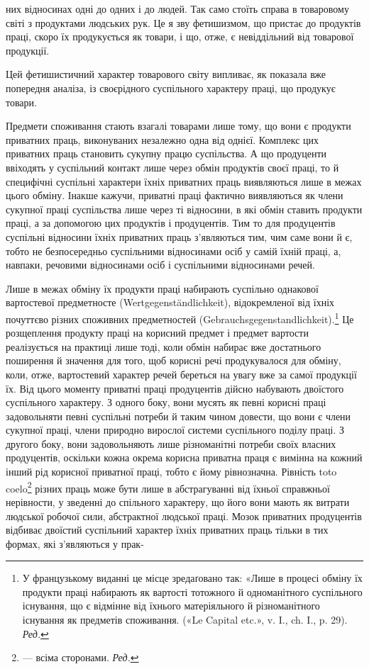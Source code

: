 них відносинах одні до одних і до людей. Так само стоїть справа
в товаровому світі з продуктами людських рук. Це я зву фетишизмом,
що пристає до продуктів праці, скоро їх продукується
як товари, і що, отже, є невіддільний від товарової продукції.

Цей фетишистичний характер товарового світу випливає, як
показала вже попередня аналіза, із своєрідного суспільного
характеру праці, що продукує товари.

Предмети споживання стають взагалі товарами лише тому, що
вони є продукти приватних праць, виконуваних незалежно одна
від однієї. Комплекс цих приватних праць становить сукупну
працю суспільства. А що продуценти ввіходять у суспільний контакт
лише через обмін продуктів своєї праці, то й специфічні суспільні
характери їхніх приватних праць виявляються лише в
межах цього обміну. Інакше кажучи, приватні праці фактично
виявляються як члени сукупної праці суспільства лише через ті
відносини, в які обмін ставить продукти праці, а за допомогою цих
продуктів і продуцентів. Тим то для продуцентів суспільні відносини
їхніх приватних праць з’являються тим, чим саме вони
й є, тобто не безпосередньо суспільними відносинами осіб у самій
їхній праці, а, навпаки, речовими відносинами осіб і суспільними
відносинами речей.

Лише в межах обміну їх продукти праці набирають суспільно
однакової вартостевої предметносте (Wertgegenständlichkeit), відокремленої
від їхніх почуттєво різних споживних предметностей
(Gebrauchsgegenstandlichkeit).\footnote*{
У французькому виданні це місце зредаґовано так: «Лише в процесі
обміну їх продукти праці набирають як вартості тотожного й одноманітного
суспільного існування, що є відмінне від їхнього матеріяльного
й різноманітного існування як предметів споживання. («Le Capital
etc.», v. I., ch. I., p. 29). \emph{Ред.}
} Це розщеплення продукту праці
на корисний предмет і предмет вартости реалізується на практиці
лише тоді, коли обмін набирає вже достатнього поширення й значення
для того, щоб корисні речі продукувалося для обміну, коли,
отже, вартостевий характер речей береться на увагу вже за самої
продукції їх. Від цього моменту приватні праці продуцентів
дійсно набувають двоїстого суспільного характеру. З одного боку,
вони мусять як певні корисні праці задовольняти певні суспільні
потреби й таким чином довести, що вони є члени сукупної праці,
члени природно вирослої системи суспільного поділу праці. З другого
боку, вони задовольняють лише різноманітні потреби своїх
власних продуцентів, оскільки кожна окрема корисна приватна
праця є вимінна на кожний інший рід корисної приватної праці,
тобто є йому рівнозначна. Рівність toto coelo\footnote*{
— всіма сторонами. \emph{Ред.}
} різних праць може
бути лише в абстрагуванні від їхньої справжньої нерівности, у
зведенні до спільного характеру, що його вони мають як витрати
людської робочої сили, абстрактної людської праці. Мозок приватних
продуцентів відбиває двоїстий суспільний характер їхніх
приватних праць тільки в тих формах, які з’являються у прак-